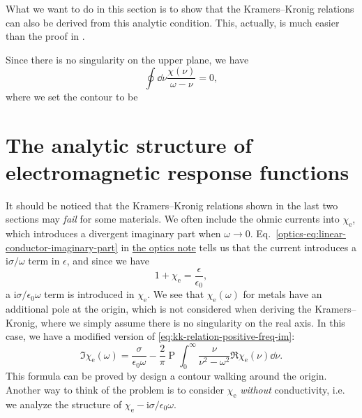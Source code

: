 \documentclass[hyperref, a4paper]{article}
\DeclareMathOperator{\primevalue}{P}
\newcommand*{\ii}{\mathrm{i}}
\newcommand{\opticsdoc}{\href{../optics/optics}{the optics note}}
\begin{document}
What we want to do in this section is to show that the Kramers–Kronig relations can also be derived from this analytic condition.
This, actually, is much easier than the proof in .

Since there is no singularity on the upper plane, we have 
\[
    \oint \dd{\nu} \frac{\chi(\nu)}{\omega - \nu} = 0,
\]
where we set the contour to be 

\section{The analytic structure of electromagnetic response functions}

It should be noticed that the Kramers–Kronig relations shown in the last two sections may \emph{fail} for some materials.
We often include the ohmic currents into $\chi_\text{e}$, which introduces a divergent imaginary part when $\omega \to 0$.
Eq.~\eqref{optics-eq:linear-conductor-imaginary-part} in \opticsdoc{} tells us that the current introduces a $\ii \sigma / \omega$ term in $\epsilon$, and since we have 
\begin{equation}
    1 + \chi_\text{e} = \frac{\epsilon}{\epsilon_0},
\end{equation}
a $\ii \sigma / \epsilon_0 \omega$ term is introduced in $\chi_\text{e}$.
We see that $\chi_\text{e}(\omega)$ for metals have an additional pole at the origin, which is not considered when deriving the Kramers–Kronig, where we simply assume there is no singularity on the real axis.
In this case, we have a modified version of \eqref{eq:kk-relation-positive-freq-im}:
\begin{equation}
    \Im \chi_\text{e}(\omega) = \frac{\sigma}{\epsilon_0 \omega} - \frac{2}{\pi} \primevalue \int_0^\infty \frac{\nu}{\nu^2 - \omega^2} \Re \chi_\text{e}(\nu) \dd{\nu}.
    \label{eq:metal-kk-relation}
\end{equation}
This formula can be proved by design a contour walking around the origin.
Another way to think of the problem is to consider $\chi_\text{e}$ \emph{without} conductivity, i.e. we analyze the structure of $\chi_\text{e} - \ii \sigma / \epsilon_0 \omega$.
\end{document}
